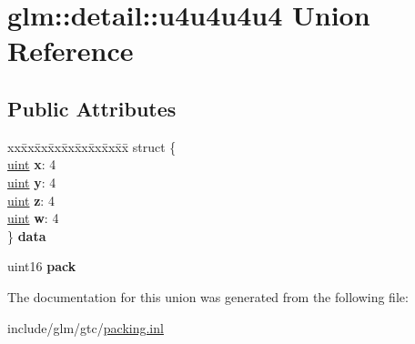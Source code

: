 \hypertarget{unionglm_1_1detail_1_1u4u4u4u4}{}\section{glm\+:\+:detail\+:\+:u4u4u4u4 Union Reference}
\label{unionglm_1_1detail_1_1u4u4u4u4}
\subsection*{Public Attributes}
\begin{DoxyCompactItemize}
\item 
\mbox{\label{unionglm_1_1detail_1_1u4u4u4u4_ae3d2d4b0c6a49c3c92981bbb5e658418}} 
\begin{tabbing}
xx\=xx\=xx\=xx\=xx\=xx\=xx\=xx\=xx\=\kill
struct \{\\
\>\hyperlink{group__core__precision_ga4fd29415871152bfb5abd588334147c8}{uint} {\bfseries x}: 4\\
\>\hyperlink{group__core__precision_ga4fd29415871152bfb5abd588334147c8}{uint} {\bfseries y}: 4\\
\>\hyperlink{group__core__precision_ga4fd29415871152bfb5abd588334147c8}{uint} {\bfseries z}: 4\\
\>\hyperlink{group__core__precision_ga4fd29415871152bfb5abd588334147c8}{uint} {\bfseries w}: 4\\
\} {\bfseries data}\\

\end{tabbing}\item 
\mbox{\label{unionglm_1_1detail_1_1u4u4u4u4_aa989a8fab51b41be68d0d07147fba3b8}} 
uint16 {\bfseries pack}
\end{DoxyCompactItemize}


The documentation for this union was generated from the following file\+:\begin{DoxyCompactItemize}
\item 
include/glm/gtc/\hyperlink{packing_8inl}{packing.\+inl}\end{DoxyCompactItemize}
